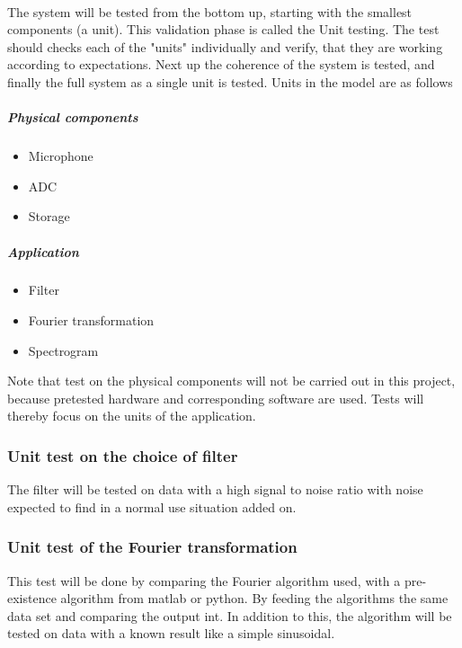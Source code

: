 \\
The system will be tested from the bottom up, starting with the smallest components (a unit). This validation phase is called the Unit testing. The test should checks each of the "units" individually and verify, that they are working according to expectations. Next up the coherence of the system is tested, and finally the full system as a single unit is tested. Units in the model are as follows
\subparagraph{Physical components}  
\begin{itemize}
	\item Microphone
	\item ADC
	\item Storage
\end{itemize}
\subparagraph{Application}
\begin{itemize}
	\item Filter
	\item Fourier transformation
	\item Spectrogram
\end{itemize}
Note that test on the physical components will not be carried out in this project, because pretested hardware and corresponding software are used. Tests will thereby focus on the units of the application.\\ 
\subsubsection{Unit test on the choice of filter}
The filter will be tested on data with a high signal to noise ratio with noise expected to find in a normal use situation added on.
\subsubsection{Unit test of the Fourier transformation}
This test will be done by comparing the Fourier algorithm used, with a pre-existence algorithm from matlab or python.
By feeding the algorithms the same data set and comparing the output int. 
In addition to this, the algorithm will be tested on data with a known result like a simple sinusoidal.
